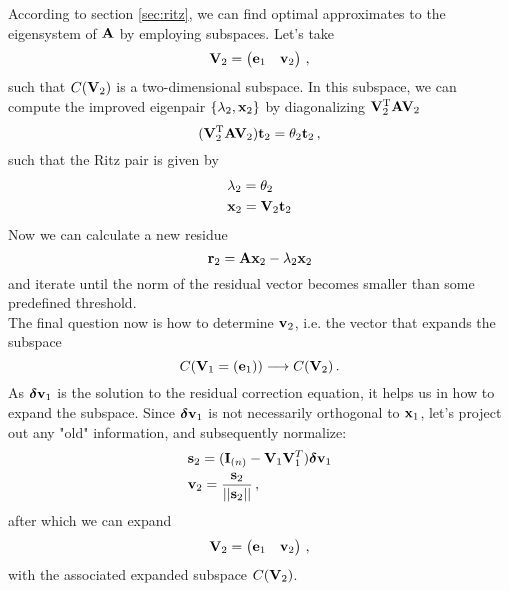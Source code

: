     According to section \ref{sec:ritz}, we can find optimal approximates to the eigensystem of $\vb{A}$ by employing subspaces. Let's take
    \begin{equation}
        \vb{V}_2 = \begin{pmatrix} \vb{e}_1 & \vb{v}_2 \end{pmatrix} \thinspace ,
    \end{equation}
    such that $C(\vb{V}_2)$ is a two-dimensional subspace. In this subspace, we can compute the improved eigenpair $\qty{\lambda_2, \vb{x}_2}$ by diagonalizing $\vb{V}_{2}^\text{T} \vb{A} \vb{V}_2$
    \begin{equation}
        (\vb{V}_2^\text{T} \vb{A} \vb{V}_2) \vb{t}_2 = \theta_2 \vb{t}_2 \thinspace ,
    \end{equation}
    such that the Ritz pair is given by
    \begin{align}
        &\lambda_2 = \theta_2 \\
        &\vb{x}_2 = \vb{V}_2 \vb{t}_2
    \end{align}
    Now we can calculate a new residue
    \begin{equation}
        \vb{r}_2 = \vb{A} \vb{x}_2 - \lambda_2 \vb{x}_2
    \end{equation}
    and iterate until the norm of the residual vector becomes smaller than some predefined threshold. \\

    The final question now is how to determine $\vb{v}_2$, i.e. the vector that expands the subspace
    \begin{equation}
        C(\vb{V}_1 = (\vb{e}_1)) \longrightarrow C(\vb{V}_2) \thinspace .
    \end{equation}
    As $\boldsymbol{\delta} \vb{v}_1$ is the solution to the residual correction equation, it helps us in how to expand the subspace. Since $\boldsymbol{\delta} \vb{v}_1$ is not necessarily orthogonal to $\vb{x}_1$, let's project out any "old" information, and subsequently normalize:
    \begin{align}
        & \vb{s}_2 = (\vb{I}_{(n)} - \vb{V}_1 \vb{V}_1^T) \boldsymbol{\delta} \vb{v}_1 \\
        & \vb{v}_2 = \frac{\vb{s}_2}{||\vb{s}_2||} \thinspace ,
    \end{align}
    after which we can expand
    \begin{equation}
        \vb{V}_2 = \begin{pmatrix} \vb{e}_1 & \vb{v}_2 \end{pmatrix} \thinspace ,
    \end{equation}
    with the associated expanded subspace $C(\vb{V}_2)$.

